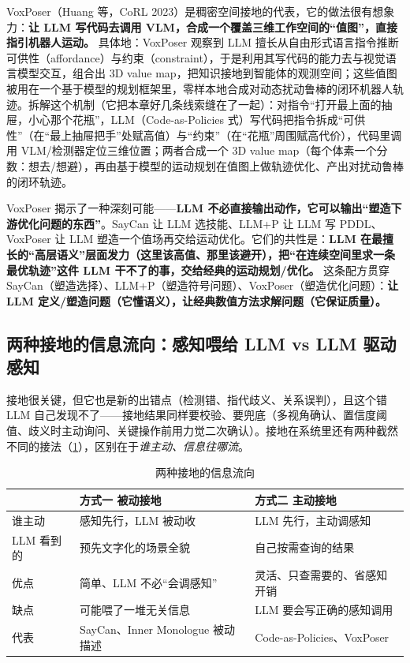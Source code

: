 VoxPoser（Huang 等，CoRL 2023）是稠密空间接地的代表，它的做法很有想象力：\textbf{让 LLM 写代码去调用 VLM，合成一个覆盖三维工作空间的“值图”，直接指引机器人运动。} 具体地：VoxPoser 观察到 LLM 擅长从自由形式语言指令推断可供性（affordance）与约束（constraint），于是利用其写代码的能力去与视觉语言模型交互，组合出 3D value map，把知识接地到智能体的观测空间；这些值图被用在一个基于模型的规划框架里，零样本地合成对动态扰动鲁棒的闭环机器人轨迹\cite{huang2023voxposer}。拆解这个机制（它把本章好几条线索缝在了一起）：对指令“打开最上面的抽屉，小心那个花瓶”，LLM（Code-as-Policies 式）写代码把指令拆成“可供性”（在“最上抽屉把手”处赋高值）与“约束”（在“花瓶”周围赋高代价），代码里调用 VLM/检测器定位三维位置；两者合成一个 3D value map（每个体素一个分数：想去/想避），再由基于模型的运动规划在值图上做轨迹优化、产出对扰动鲁棒的闭环轨迹。

\begin{insight}
VoxPoser 揭示了一种深刻可能——\textbf{LLM 不必直接输出动作，它可以输出“塑造下游优化问题的东西”}。SayCan 让 LLM 选技能、LLM+P 让 LLM 写 PDDL、VoxPoser 让 LLM 塑造一个值场再交给运动优化。它们的共性是：\textbf{LLM 在最擅长的“高层语义”层面发力（这里该高值、那里该避开），把“在连续空间里求一条最优轨迹”这件 LLM 干不了的事，交给经典的运动规划/优化。} 这条配方贯穿 SayCan（塑造选择）、LLM+P（塑造符号问题）、VoxPoser（塑造优化问题）：\textbf{让 LLM 定义/塑造问题（它懂语义），让经典数值方法求解问题（它保证质量）。}
\end{insight}

\subsection{两种接地的信息流向：感知喂给 LLM vs LLM 驱动感知}
\label{sec:grounding-flow}

接地很关键，但它也是新的出错点（检测错、指代歧义、关系误判），且这个错 LLM 自己发现不了——接地结果同样要校验、要兜底（多视角确认、置信度阈值、歧义时主动询问、关键操作前用力觉二次确认）。接地在系统里还有两种截然不同的接法（\cref{tab:grounding-flow}），区别在于\emph{谁主动、信息往哪流}。

\begin{table}[H]\centering\small
\caption{两种接地的信息流向}
\label{tab:grounding-flow}
\begin{tabular}{p{2.4cm}p{4.2cm}p{4.6cm}}
\toprule
 & 方式一 被动接地 & 方式二 主动接地 \\
\midrule
谁主动 & 感知先行，LLM 被动收 & LLM 先行，主动调感知 \\
LLM 看到的 & 预先文字化的场景全貌 & 自己按需查询的结果 \\
优点 & 简单、LLM 不必“会调感知” & 灵活、只查需要的、省感知开销 \\
缺点 & 可能喂了一堆无关信息 & LLM 要会写正确的感知调用 \\
代表 & SayCan、Inner Monologue 被动描述 & Code-as-Policies、VoxPoser \\
\bottomrule
\end{tabular}
\end{table}


